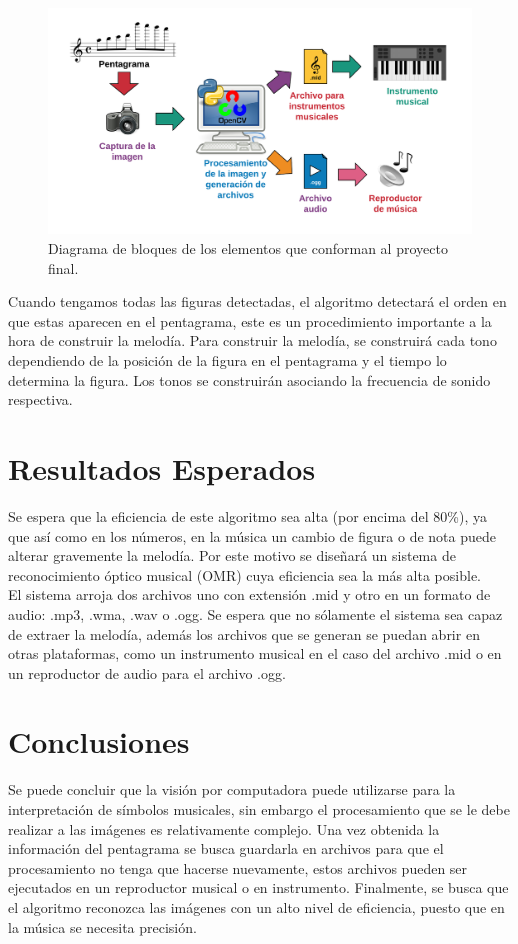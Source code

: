 \documentclass[letterpaper,12pt, twocolumn]{article}
\begin{document}
\begin{figure}[h]
\centering
\includegraphics[clip,width=\columnwidth]
{figs/bloques.png}
\caption{Diagrama de bloques de los elementos 
que conforman al proyecto final.}
\label{bloques}
\end{figure}

Cuando tengamos todas las figuras detectadas, el 
algoritmo detectará el orden en que estas aparecen 
en el pentagrama, este es un procedimiento importante 
a la hora de construir la melodía. Para construir la 
melodía, se construirá cada tono dependiendo de la 
posición de la figura en el pentagrama y el tiempo 
lo determina la figura. Los tonos se construirán 
asociando la frecuencia de sonido respectiva.

\section{Resultados Esperados}
Se espera que la eficiencia de este algoritmo sea alta 
(por encima del 80\%), ya que así como en los números, 
en la música un cambio de figura o de nota puede alterar 
gravemente la melodía. Por este motivo se diseñará un 
sistema de reconocimiento óptico musical (OMR) cuya 
eficiencia sea la más alta posible. \\

El sistema arroja dos archivos uno con extensión .mid 
y otro en un formato de audio: .mp3, .wma, .wav o .ogg.
Se espera que no sólamente el sistema sea capaz de 
extraer la melodía, además los archivos que se generan 
se puedan abrir en otras plataformas, como un instrumento 
musical en el caso del archivo .mid o en un reproductor 
de audio para el archivo .ogg. 

\section{Conclusiones}

Se puede concluir que la visión por computadora puede 
utilizarse para la interpretación de símbolos musicales, 
sin embargo el procesamiento que se le debe realizar 
a las imágenes es relativamente complejo. Una vez 
obtenida la información del pentagrama se busca 
guardarla en archivos para que el procesamiento 
no tenga que hacerse nuevamente, estos archivos 
pueden ser ejecutados en un reproductor musical o en 
instrumento. Finalmente, se busca que el algoritmo 
reconozca las imágenes con un alto nivel de eficiencia, 
puesto que en la música se necesita precisión. 
\end{document}

